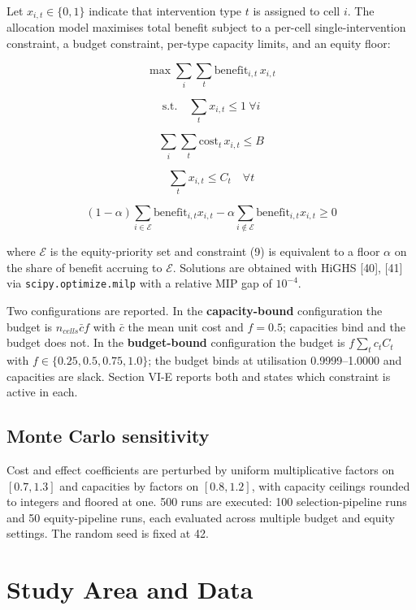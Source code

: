\documentclass[conference]{IEEEtran}
\begin{document}
Let \(x_{i,t} \in \{0,1\}\) indicate that intervention type \(t\) is assigned to cell \(i\). The
allocation model maximises total benefit subject to a per-cell single-intervention constraint, a
budget constraint, per-type capacity limits, and an equity floor:

\[\max \sum_i \sum_t \mathrm{benefit}_{i,t} \, x_{i,t} \tag{5}\]

\[\text{s.t.}\quad \sum_t x_{i,t} \leq 1 \ \forall i \tag{6}\]

\[\sum_i \sum_t \mathrm{cost}_t \, x_{i,t} \leq B \tag{7}\]

\[\sum_t x_{i,t} \leq C_t \quad \forall t \tag{8}\]

\[(1 - \alpha) \sum_{i \in \mathcal{E}} \mathrm{benefit}_{i,t} x_{i,t} - \alpha \sum_{i \notin \mathcal{E}} \mathrm{benefit}_{i,t} x_{i,t} \geq 0 \tag{9}\]

where \(\mathcal{E}\) is the equity-priority set and constraint (9) is equivalent to a floor \(\alpha\) on
the share of benefit accruing to \(\mathcal{E}\). Solutions are obtained with HiGHS {[}40{]}, {[}41{]} via
\texttt{scipy.optimize.milp} with a relative MIP gap of \(10^{-4}\).

Two configurations are reported. In the \textbf{capacity-bound} configuration the budget is
\(n_{cells} \bar{c} f\) with \(\bar{c}\) the mean unit cost and \(f = 0.5\); capacities bind and the budget
does not. In the \textbf{budget-bound} configuration the budget is \(f \sum_t c_t C_t\) with
\(f \in \{0.25, 0.5, 0.75, 1.0\}\); the budget binds at utilisation 0.9999--1.0000 and capacities are
slack. Section VI-E reports both and states which constraint is active in each.

\subsection{Monte Carlo sensitivity}\label{i.-monte-carlo-sensitivity}

Cost and effect coefficients are perturbed by uniform multiplicative factors on \([0.7, 1.3]\) and
capacities by factors on \([0.8, 1.2]\), with capacity ceilings rounded to integers and floored at one.
500 runs are executed: 100 selection-pipeline runs and 50 equity-pipeline runs, each evaluated across
multiple budget and equity settings. The random seed is fixed at 42.

\section{Study Area and Data}\label{iv.-study-area-and-data}
\end{document}
